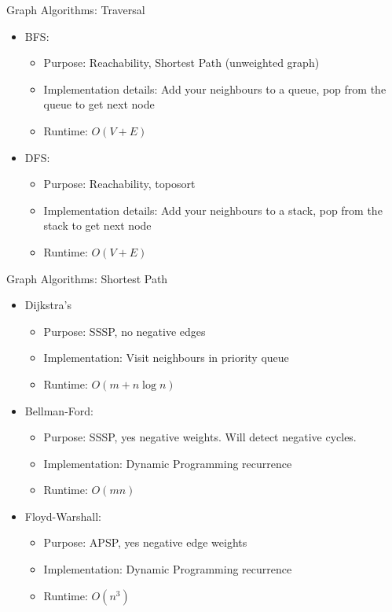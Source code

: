 \documentclass{beamer}
\begin{document}
\begin{frame}[t]{Graph Algorithms: Traversal}
  \begin{itemize}
    \pause
      \item \alert{BFS:} 
      \begin{itemize}
          \item \alert{Purpose:} Reachability, Shortest Path (unweighted graph)
          \item \alert{Implementation details:} Add your neighbours to a \alert{queue}, pop from the queue to get next node
          \item \alert{Runtime:} $O(V + E)$
      \end{itemize}
    \pause
      \item \alert{DFS:} 
      \begin{itemize}
          \item \alert{Purpose:} Reachability, toposort 
          \item \alert{Implementation details:} Add your neighbours to a \alert{stack}, pop from the stack to get next node
          \item \alert{Runtime:} $O(V + E)$
      \end{itemize}
  \end{itemize}
\end{frame}

\begin{frame}[t]{Graph Algorithms: Shortest Path}
  \begin{itemize}
  \pause
    \item \alert{Dijkstra's}
    \begin{itemize}
        \item \alert{Purpose:} SSSP, no negative edges
        \item \alert{Implementation:} Visit neighbours in \alert{priority queue}
        \item \alert{Runtime:} $O(m+n \log n)$
    \end{itemize}
    \pause
    \item \alert{Bellman-Ford:}
    \begin{itemize}
        \item \alert{Purpose:} SSSP, yes negative weights. Will detect negative cycles.
        \item \alert{Implementation:} Dynamic Programming recurrence
        \item \alert{Runtime:} $O(mn)$
    \end{itemize}
    \pause
    \item \alert{Floyd-Warshall:}
    \begin{itemize}
        \item \alert{Purpose:} APSP, yes negative edge weights
        \item \alert{Implementation:} Dynamic Programming recurrence
        \item \alert{Runtime:} $O(n^3)$
    \end{itemize}
  \end{itemize}
\end{frame}
\end{document}
